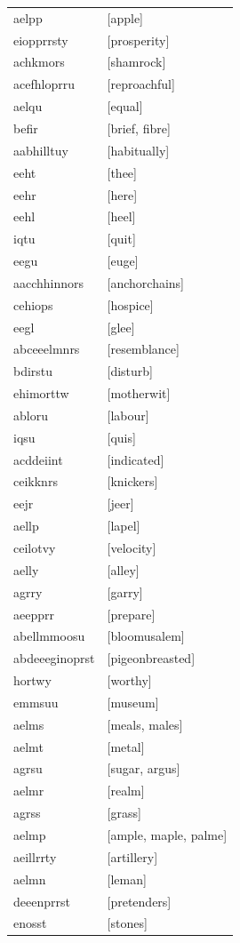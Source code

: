 \documentclass{article}
\begin{document}
\begin{tabular}{ll}
aelpp & [apple] \\
eiopprrsty & [prosperity] \\
achkmors & [shamrock] \\
acefhloprru & [reproachful] \\
aelqu & [equal] \\
befir & [brief, fibre] \\
aabhilltuy & [habitually] \\
eeht & [thee] \\
eehr & [here] \\
eehl & [heel] \\
iqtu & [quit] \\
eegu & [euge] \\
aacchhinnors & [anchorchains] \\
cehiops & [hospice] \\
eegl & [glee] \\
abceeelmnrs & [resemblance] \\
bdirstu & [disturb] \\
ehimorttw & [motherwit] \\
abloru & [labour] \\
iqsu & [quis] \\
acddeiint & [indicated] \\
ceikknrs & [knickers] \\
eejr & [jeer] \\
aellp & [lapel] \\
ceilotvy & [velocity] \\
aelly & [alley] \\
agrry & [garry] \\
aeepprr & [prepare] \\
abellmmoosu & [bloomusalem] \\
abdeeeginoprst & [pigeonbreasted] \\
hortwy & [worthy] \\
emmsuu & [museum] \\
aelms & [meals, males] \\
aelmt & [metal] \\
agrsu & [sugar, argus] \\
aelmr & [realm] \\
agrss & [grass] \\
aelmp & [ample, maple, palme] \\
aeillrrty & [artillery] \\
aelmn & [leman] \\
deeenprrst & [pretenders] \\
enosst & [stones] \\

\end{tabular}
\end{document}
